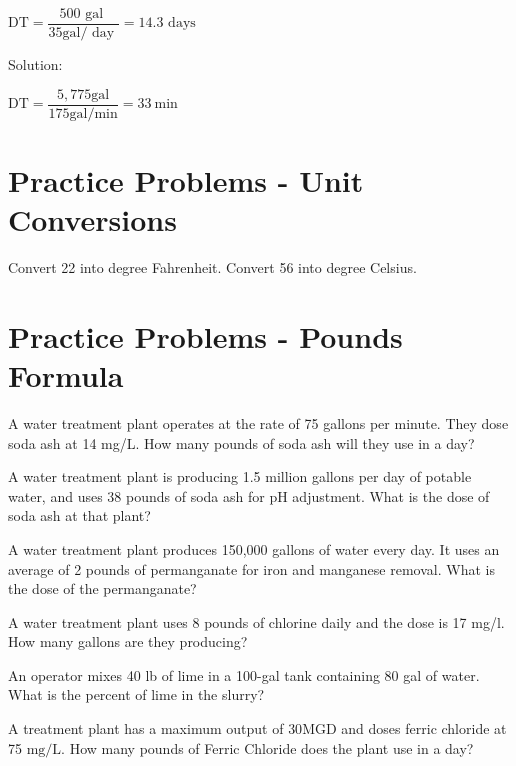 \vspace{0.4cm}

$
\mathrm{DT}=\dfrac{500 \text { gal }}{35 \mathrm{gal} / \text { day }}=14.3 \text { days }
$
\vspace{0.4cm}

Solution:\\

\vspace{0.4cm}

$
\mathrm{DT}=\dfrac{5,775 \mathrm{gal}}{175 \mathrm{gal} / \mathrm{min}}=33 \mathrm{~min}
$


\vspace{1cm}

\section*{Practice Problems - Unit Conversions}

Convert 22 into degree Fahrenheit.
Convert 56 into degree Celsius.

\vspace{1cm}

\section*{Practice Problems - Pounds Formula}


A water treatment plant operates at the rate of 75 gallons per minute. They dose soda ash at
14 mg/L. How many pounds of soda ash will they use in a day?

A water treatment plant is producing 1.5 million gallons per day of potable water, and
uses 38 pounds of soda ash for pH adjustment. What is the dose of soda ash at that plant?

A water treatment plant produces 150,000 gallons of water every day. It uses an
average of 2 pounds of permanganate for iron and manganese removal. What is the dose of the
permanganate? 

A water treatment plant uses 8 pounds of chlorine daily and the dose is 17 mg/l. How
many gallons are they producing?

An operator mixes 40 lb of lime in a 100-gal tank containing 80 gal of water. What is the percent of lime in the slurry?

A treatment plant has a maximum output of $30 \mathrm{MGD}$ and doses ferric chloride at 75 $\mathrm{mg} / \mathrm{L}$. How many pounds of Ferric Chloride does the plant use in a day?\\

